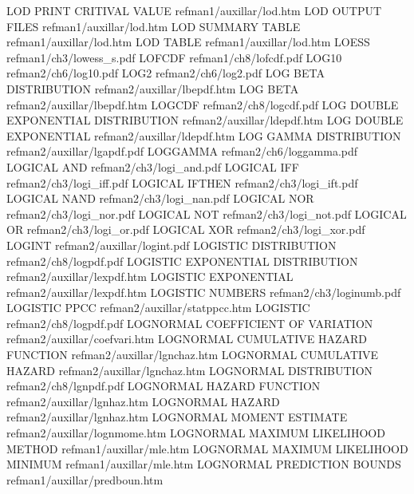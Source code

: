 LOD PRINT CRITIVAL VALUE                refman1/auxillar/lod.htm
LOD OUTPUT FILES                        refman1/auxillar/lod.htm
LOD SUMMARY TABLE                       refman1/auxillar/lod.htm
LOD TABLE                               refman1/auxillar/lod.htm
LOESS                                   refman1/ch3/lowess_s.pdf
LOFCDF                                  refman1/ch8/lofcdf.pdf
LOG10                                   refman2/ch6/log10.pdf
LOG2                                    refman2/ch6/log2.pdf
LOG BETA DISTRIBUTION                   refman2/auxillar/lbepdf.htm
LOG BETA                                refman2/auxillar/lbepdf.htm
LOGCDF                                  refman2/ch8/logcdf.pdf
LOG DOUBLE EXPONENTIAL DISTRIBUTION     refman2/auxillar/ldepdf.htm
LOG DOUBLE EXPONENTIAL                  refman2/auxillar/ldepdf.htm
LOG GAMMA DISTRIBUTION                  refman2/auxillar/lgapdf.pdf
LOGGAMMA                                refman2/ch6/loggamma.pdf
LOGICAL AND                             refman2/ch3/logi_and.pdf
LOGICAL IFF                             refman2/ch3/logi_iff.pdf
LOGICAL IFTHEN                          refman2/ch3/logi_ift.pdf
LOGICAL NAND                            refman2/ch3/logi_nan.pdf
LOGICAL NOR                             refman2/ch3/logi_nor.pdf
LOGICAL NOT                             refman2/ch3/logi_not.pdf
LOGICAL OR                              refman2/ch3/logi_or.pdf
LOGICAL XOR                             refman2/ch3/logi_xor.pdf
LOGINT                                  refman2/auxillar/logint.pdf
LOGISTIC DISTRIBUTION                   refman2/ch8/logpdf.pdf
LOGISTIC EXPONENTIAL DISTRIBUTION       refman2/auxillar/lexpdf.htm
LOGISTIC EXPONENTIAL                    refman2/auxillar/lexpdf.htm
LOGISTIC NUMBERS                        refman2/ch3/loginumb.pdf
LOGISTIC PPCC                           refman2/auxillar/statppcc.htm
LOGISTIC                                refman2/ch8/logpdf.pdf
LOGNORMAL COEFFICIENT OF VARIATION      refman2/auxillar/coefvari.htm
LOGNORMAL CUMULATIVE HAZARD FUNCTION    refman2/auxillar/lgnchaz.htm
LOGNORMAL CUMULATIVE HAZARD             refman2/auxillar/lgnchaz.htm
LOGNORMAL DISTRIBUTION                  refman2/ch8/lgnpdf.pdf
LOGNORMAL HAZARD FUNCTION               refman2/auxillar/lgnhaz.htm
LOGNORMAL HAZARD                        refman2/auxillar/lgnhaz.htm
LOGNORMAL MOMENT ESTIMATE               refman2/auxillar/lognmome.htm
LOGNORMAL MAXIMUM LIKELIHOOD METHOD     refman1/auxillar/mle.htm
LOGNORMAL MAXIMUM LIKELIHOOD MINIMUM    refman1/auxillar/mle.htm
LOGNORMAL PREDICTION BOUNDS             refman1/auxillar/predboun.htm
